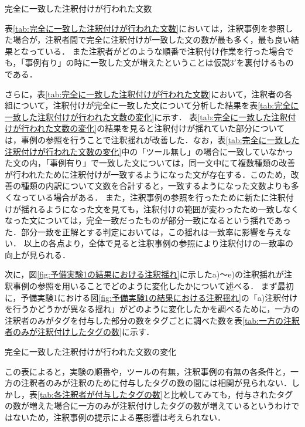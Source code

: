 \documentclass[japanese]{jnlp_1.4}
\begin{document}
\begin{table}[b]
\caption{完全に一致した注釈付けが行われた文数}
\label{tab:完全に一致した注釈付けが行われた文数}

\end{table}

表\ref{tab:完全に一致した注釈付けが行われた文数}においては，注釈事例を参照した場合が，注釈者間で完全に注釈付けが一致した文の数が最も多く，最も良い結果となっている．
また注釈者がどのような順番で注釈付け作業を行った場合でも，「事例有り」の時に一致した文が増えたということは仮説3$'$を裏付けるものである．

さらに，表\ref{tab:完全に一致した注釈付けが行われた文数}において，注釈者の各組について，注釈付けが完全に一致した文について分析した結果を表\ref{tab:完全に一致した注釈付けが行われた文数の変化}に示す．
表\ref{tab:完全に一致した注釈付けが行われた文数の変化}の結果を見ると注釈付けが揺れていた部分については，事例の参照を行うことで注釈揺れが改善した．なお，表\ref{tab:完全に一致した注釈付けが行われた文数の変化}中の「ツール無し」の場合に一致していなかった文の内，「事例有り」で一致した文については，同一文中にて複数種類の改善が行われたために注釈付けが一致するようになった文が存在する．このため，改善の種類の内訳について文数を合計すると，一致するようになった文数よりも多くなっている場合がある．
また，注釈事例の参照を行ったために新たに注釈付けが揺れるようになった文を見ても，注釈付けの範囲が変わったため一致しなくなった文については，完全一致だったものが部分一致になるという揺れであった．部分一致を正解とする判定においては，この揺れは一致率に影響を与えない．
以上の各点より，全体で見ると注釈事例の参照により注釈付けの一致率の向上が見られる．

次に，図\ref{fig:予備実験1の結果における注釈揺れ}に示したa)〜e)の注釈揺れが注釈事例の参照を用いることでどのように変化したかについて述べる．
まず最初に，予備実験1における図\ref{fig:予備実験1の結果における注釈揺れ}の「a)注釈付けを行うかどうかが異なる揺れ」がどのように変化したかを調べるために，一方の注釈者のみがタグを付与した部分の数をタグごとに調べた数を表\ref{tab:一方の注釈者のみが注釈付けしたタグの数}に示す．

\begin{table}[t]
\caption{完全に一致した注釈付けが行われた文数の変化}
\label{tab:完全に一致した注釈付けが行われた文数の変化}

\end{table}

この表によると，実験の順番や，ツールの有無，注釈事例の有無の各条件と，一方の注釈者のみが注釈のために付与したタグの数の間には相関が見られない．しかし，表\ref{tab:各注釈者が付与したタグの数}と比較してみても，付与されたタグの数が増えた場合に一方のみが注釈付けしたタグの数が増えているというわけではないため，注釈事例の提示による悪影響は考えられない．
\end{document}
